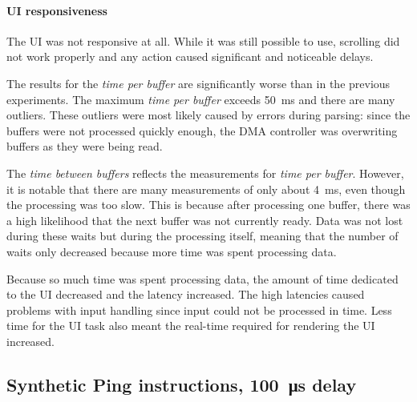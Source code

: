 \paragraph{UI responsiveness}

The UI was not responsive at all. While it was still possible to use, scrolling did not work properly
and any action caused significant and noticeable delays.
\bigbreak

The results for the \textit{time per buffer} are significantly worse than in the previous experiments.
The maximum \textit{time per buffer} exceeds \SI{50}{\milli\second} and there are many outliers.
These outliers were most likely caused by errors during parsing: since the buffers were not processed
quickly enough, the DMA controller was overwriting buffers as they were being read.

The \textit{time between buffers} reflects the measurements for \textit{time per buffer}. However,
it is notable that there are many measurements of only about \SI{4}{\milli\second}, even though the
processing was too slow. This is because after processing one buffer, there was a high likelihood
that the next buffer was not currently ready. Data was not lost during these waits but during the
processing itself, meaning that the number of waits only decreased because more time was spent
processing data.

Because so much time was spent processing data, the amount of time dedicated to the UI decreased and
the latency increased. The high latencies caused problems with input handling since input could not be
processed in time. Less time for the UI task also meant the real-time required for rendering the UI
increased.

\clearpage
\subsection{Synthetic Ping instructions, \SI{100}{\micro\second} delay}
\label{evaluation/results/synthetic-ping-instructions-100us-delay}

